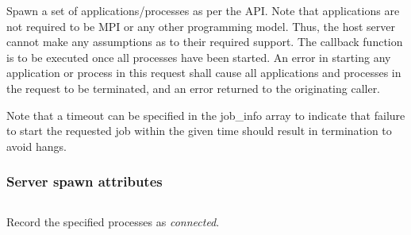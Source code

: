 \optattrend

\descr

Spawn a set of applications/processes as per the  API.
Note that applications are not required to be \ac{MPI} or any other programming model.
Thus, the host server cannot make any assumptions as to their required support.
The callback function is to be executed once all processes have been started.
An error in starting any application or process in this request shall cause all applications and processes in the request to be terminated, and an error returned to the originating caller.

Note that a timeout can be specified in the job_info array to indicate that failure to start the requested job within the given time should result in termination to avoid hangs.

\subsubsection{Server spawn attributes}

%
%


\subsection{}

\summary

Record the specified processes as \textit{connected}.

\format


